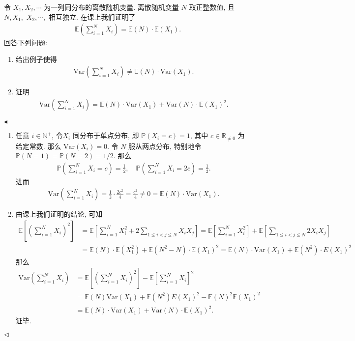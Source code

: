 \documentclass[11pt]{article}
\newenvironment{problem}[2][Problem]{\begin{trivlist}
    \item[\hskip \labelsep {\bfseries #1}\hskip \labelsep {\bfseries #2.}]\songti}{\hfill$\blacktriangleleft$\end{trivlist}}
\newenvironment{answer}[1][Solution]{\begin{trivlist}
    \item[\hskip \labelsep {\bfseries #1.}\hskip \labelsep]}{\hfill$\lhd$\end{trivlist}}
\newcommand\1{\mathds{1}}
\newcommand\R{\mathbb{R}}
\newcommand\E{\mathbb{E}}
\newcommand\N{\mathbb{N}}
\newcommand\PP{\mathbb{P}}
\newcommand\Var{\mathrm{Var}}
\begin{document}
\begin{problem}{4}
    令 $X_1, X_2, \cdots$ 为一列同分布的离散随机变量. 离散随机变量 $N$ 取正整数值, 且 $N, X_1,$ $X_2, \cdots,$ 相互独立. 在课上我们证明了 
    \begin{align*}
        \E\left(\sum_{i=1}^{N}X_i\right) = \E(N)\cdot\E(X_1).
    \end{align*} 
    回答下列问题:
    \begin{enumerate}[label=(\arabic*)]
        \item 给出例子使得 
        \begin{align*}
            \Var\left(\sum_{i=1}^{N} X_i\right) \neq \E(N) \cdot \Var(X_1).
        \end{align*}
        \item 证明
        \begin{align*}
            \Var\left(\sum_{i=1}^{N} X_i\right) = \E(N)\cdot \Var(X_1) + \Var(N)\cdot \E(X_1)^2.
        \end{align*}
    \end{enumerate}
\end{problem}
\begin{answer}
    \begin{enumerate}[label=(\arabic*)]
        \item 任意 $i\in \N^+$, 令$X_i$ 同分布于单点分布, 即 $\PP(X_i = c) = 1$, 其中 $c\in \R_{\neq 0}$ 为 给定常数. 那么 $\Var(X_i) = 0$. 令 $N$ 服从两点分布, 特别地令 $\PP(N = 1) = \PP(N = 2) = 1/2$. 
        那么
        \begin{align*}
            \PP\left(\sum_{i=1}^{N}X_i = c\right) = \frac{1}{2}, \quad \PP\left(\sum_{i=1}^{N}X_i = 2c\right) = \frac{1}{2}.
        \end{align*}
        进而
        \begin{align*}
            \Var\left(\sum_{i=1}^{N}X_i\right) = \frac{1}{2} \cdot \frac{2c^2}{4} = \frac{c^2}{4}  \neq 0 = \E(N) \cdot \Var(X_1).
        \end{align*}
        \item 由课上我们证明的结论, 可知
        \begin{align*}
            \E\left[\left(\sum_{i=1}^{N} X_i\right)^2\right] &= \E\left[\sum_{i=1}^{N}X_i^2 + 2 \sum_{1\le i < j \le N}X_i X_j\right] = \E\left[\sum_{i=1}^{N}X_i^2\right] + \E\left[\sum_{1\le i < j \le N}2X_i X_j\right] \\
            &= \E(N) \cdot \E(X_1^2) + \E(N^2 - N) \cdot \E(X_1)^2  =  \E(N)\cdot \Var(X_1) + \E(N^2)\cdot E(X_1)^2
        \end{align*}
        那么
        \begin{align*}
            \Var\left(\sum_{i=1}^{N}X_i\right) &= \E\left[\left(\sum_{i=1}^{N}X_i\right)^2\right] - \E\left[\sum_{i=1}^{N}X_i\right]^2 \\
            &= \E(N)\Var(X_1) + \E(N^2)E(X_1)^2 - \E(N)^2\E(X_1)^2 \\
            &= \E(N)\cdot \Var(X_1) + \Var(N)\cdot \E(X_1)^2.
        \end{align*}
        证毕.
    \end{enumerate}
\end{answer}
\end{document}
